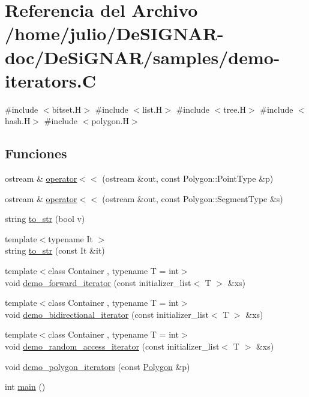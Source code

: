 \hypertarget{demo-iterators_8_c}{}\section{Referencia del Archivo /home/julio/\+De\+S\+I\+G\+N\+A\+R-\/doc/\+De\+Si\+G\+N\+A\+R/samples/demo-\/iterators.C}
\label{demo-iterators_8_c}
{\ttfamily \#include $<$bitset.\+H$>$}\newline
{\ttfamily \#include $<$list.\+H$>$}\newline
{\ttfamily \#include $<$tree.\+H$>$}\newline
{\ttfamily \#include $<$hash.\+H$>$}\newline
{\ttfamily \#include $<$polygon.\+H$>$}\newline
\subsection*{Funciones}
\begin{DoxyCompactItemize}
\item 
ostream \& \hyperlink{demo-iterators_8_c_a923e96e2eb2a21cf7d668e804417c47a}{operator$<$$<$} (ostream \&out, const Polygon\+::\+Point\+Type \&p)
\item 
ostream \& \hyperlink{demo-iterators_8_c_aeeb3d06d99a03eacdce5a549712941cb}{operator$<$$<$} (ostream \&out, const Polygon\+::\+Segment\+Type \&s)
\item 
string \hyperlink{demo-iterators_8_c_af423c937ed0522544ed90c34b85d897e}{to\+\_\+str} (bool v)
\item 
{\footnotesize template$<$typename It $>$ }\\string \hyperlink{demo-iterators_8_c_af8bbc1c2b472077a39826f8635457c12}{to\+\_\+str} (const It \&it)
\item 
{\footnotesize template$<$class Container , typename T  = int$>$ }\\void \hyperlink{demo-iterators_8_c_a971180b8ea13c61009c451fe7a942839}{demo\+\_\+forward\+\_\+iterator} (const initializer\+\_\+list$<$ T $>$ \&xs)
\item 
{\footnotesize template$<$class Container , typename T  = int$>$ }\\void \hyperlink{demo-iterators_8_c_a26a099cedf4512aa8f05c2dd18e4b3d2}{demo\+\_\+bidirectional\+\_\+iterator} (const initializer\+\_\+list$<$ T $>$ \&xs)
\item 
{\footnotesize template$<$class Container , typename T  = int$>$ }\\void \hyperlink{demo-iterators_8_c_ad21d9d25e5563ab0ee7ebd1a3092b1df}{demo\+\_\+random\+\_\+access\+\_\+iterator} (const initializer\+\_\+list$<$ T $>$ \&xs)
\item 
void \hyperlink{demo-iterators_8_c_a17b3db72ea3737c300ed830ce644aba8}{demo\+\_\+polygon\+\_\+iterators} (const \hyperlink{class_designar_1_1_polygon}{Polygon} \&p)
\item 
int \hyperlink{demo-iterators_8_c_ae66f6b31b5ad750f1fe042a706a4e3d4}{main} ()
\end{DoxyCompactItemize}


